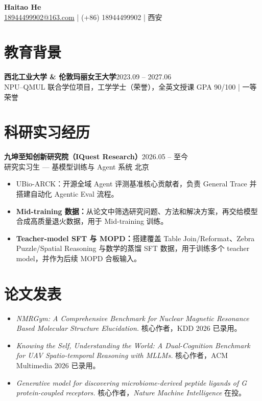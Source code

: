 \documentclass[9pt,a4paper]{ctexart}
\newcommand{\entry}[3]{\textbf{#1}\hfill #2\\#3\par}
\begin{document}
\begin{center}
  {\Large\bfseries Haitao He}\\[1pt]
  \href{mailto:18944499902@163.com}{18944499902@163.com} \;|\; (+86) 18944499902 \;|\; 西安
\end{center}

\section{教育背景}
\entry{西北工业大学 \& 伦敦玛丽女王大学}{2023.09 -- 2027.06}{NPU--QMUL 联合学位项目，工学学士（荣誉），全英文授课 \hfill GPA 90/100 \;|\; 一等荣誉}

\section{科研实习经历}
\entry{九坤至知创新研究院（IQuest Research）}{2026.05 -- 至今}{研究实习生 --- 基模型训练与 Agent 系统 \hfill 北京}
\begin{itemize}
  \item UBio-ARCK：开源全域 Agent 评测基准核心贡献者，负责 General Trace 并搭建自动化 Agentic Eval 流程。
  \item \textbf{Mid-training 数据：}从论文中筛选研究问题、方法和解决方案，再交给模型合成高质量退火数据，用于 Mid-training 训练。
  \item \textbf{Teacher-model SFT 与 MOPD：}搭建覆盖 Table Join/Reformat、Zebra Puzzle/Spatial Reasoning 与数学的蒸馏 SFT 数据，用于训练多个 teacher model，并作为后续 MOPD 合板输入。
\end{itemize}

\section{论文发表}
\begin{itemize}
  \item \textit{NMRGym: A Comprehensive Benchmark for Nuclear Magnetic Resonance Based Molecular Structure Elucidation.} 核心作者，KDD 2026 已录用。
  \item \textit{Knowing the Self, Understanding the World: A Dual-Cognition Benchmark for UAV Spatio-temporal Reasoning with MLLMs.} 核心作者，ACM Multimedia 2026 已录用。
  \item \textit{Generative model for discovering microbiome-derived peptide ligands of G protein-coupled receptors.} 核心作者，\textit{Nature Machine Intelligence} 在投。
\end{itemize}
\end{document}
